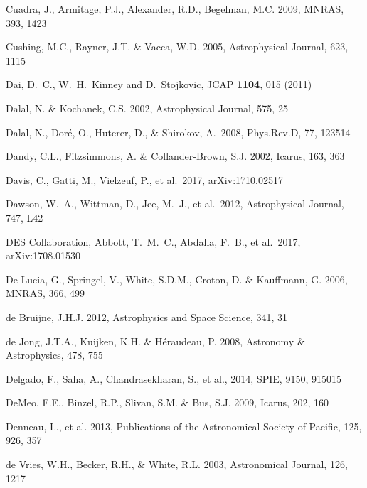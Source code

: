 \documentclass[twocolumn]{aastex61}
\begin{document}
\begin{thebibliography}{}
 Cuadra, J., Armitage, P.J., Alexander, R.D., Begelman, M.C. 2009, MNRAS, 393, 1423

 Cushing, M.C., Rayner, J.T. \& Vacca, W.D. 2005, Astrophysical Journal, 623, 1115

 Dai, D.~C., W.~H.~Kinney and D.~Stojkovic, JCAP {\bf 1104}, 015 (2011)

 Dalal, N. \& Kochanek, C.S. 2002, Astrophysical Journal, 575, 25

 Dalal, N., Dor{\'e}, O., Huterer, D., \& Shirokov, A.\ 2008, Phys.Rev.D, 77, 123514

 Dandy, C.L., Fitzsimmons, A. \& Collander-Brown, S.J. 2002, Icarus, 163, 363

 Davis, C., Gatti, M., Vielzeuf, P., et al.\ 2017, arXiv:1710.02517

 Dawson, W.~A., Wittman, D., Jee, M.~J., et al.\ 2012, Astrophysical Journal, 747, L42

 DES Collaboration, Abbott, T.~M.~C., Abdalla, F.~B., et al.\ 2017, arXiv:1708.01530

 De Lucia, G., Springel, V., White, S.D.M., Croton, D. \& Kauffmann, G. 2006, MNRAS, 366, 499

 de Bruijne, J.H.J. 2012, Astrophysics and Space Science, 341, 31

 de Jong, J.T.A., Kuijken, K.H. \& H\'{e}raudeau, P. 2008, Astronomy \& Astrophysics, 478, 755

 Delgado, F., Saha, A., Chandrasekharan, S., et al.,  2014,  SPIE, 9150, 915015

 DeMeo, F.E., Binzel, R.P., Slivan, S.M. \& Bus, S.J. 2009, Icarus, 202, 160

 Denneau, L., et al. 2013, Publications of the Astronomical Society of Pacific, 125,  926, 357

 de Vries, W.H., Becker, R.H., \& White, R.L. 2003, Astronomical Journal, 126, 1217


\end{thebibliography}
\end{document}
